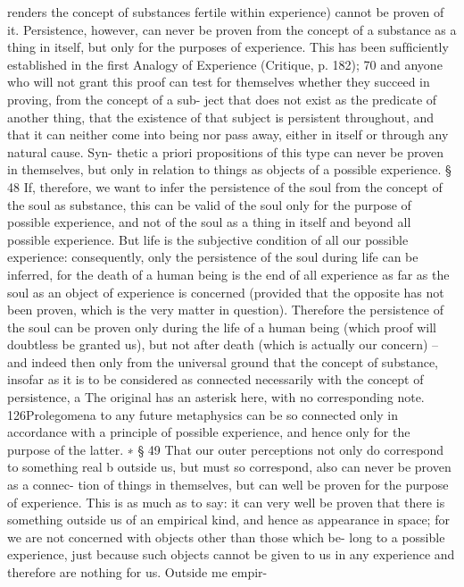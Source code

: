 renders the concept of substances fertile within experience) cannot be
proven of it.
Persistence, however, can never be proven from the concept of a
substance as a thing in itself, but only for the purposes of experience.
This has been sufﬁciently established in the ﬁrst Analogy of Experience
(Critique, p. 182); 70 and anyone who will not grant this proof can test for
themselves whether they succeed in proving, from the concept of a sub-
ject that does not exist as the predicate of another thing, that the existence
of that subject is persistent throughout, and that it can neither come into
being nor pass away, either in itself or through any natural cause. Syn-
thetic a priori propositions of this type can never be proven in themselves,
but only in relation to things as objects of a possible experience.
§ 48
If, therefore, we want to infer the persistence of the soul from the concept
of the soul as substance, this can be valid of the soul only for the purpose of
possible experience, and not of the soul as a thing in itself and beyond all
possible experience. But life is the subjective condition of all our possible
experience: consequently, only the persistence of the soul during life can
be inferred, for the death of a human being is the end of all experience
as far as the soul as an object of experience is concerned (provided that
the opposite has not been proven, which is the very matter in question).
Therefore the persistence of the soul can be proven only during the life
of a human being (which proof will doubtless be granted us), but not
after death (which is actually our concern) – and indeed then only from
the universal ground that the concept of substance, insofar as it is to
be considered as connected necessarily with the concept of persistence,
a
The original has an asterisk here, with no corresponding note.
126Prolegomena to any future metaphysics
can be so connected only in accordance with a principle of possible
experience, and hence only for the purpose of the latter. ∗
§ 49
That our outer perceptions not only do correspond to something real b
outside us, but must so correspond, also can never be proven as a connec-
tion of things in themselves, but can well be proven for the purpose of
experience. This is as much as to say: it can very well be proven that there
is something outside us of an empirical kind, and hence as appearance in
space; for we are not concerned with objects other than those which be-
long to a possible experience, just because such objects cannot be given to
us in any experience and therefore are nothing for us. Outside me empir-

